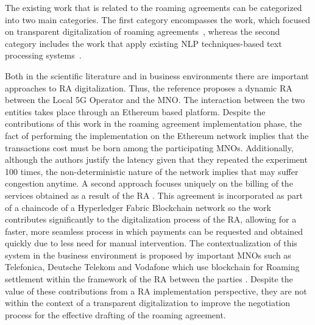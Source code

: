 \documentclass[conference]{style/IEEEtran}
\begin{document}
The existing work that is related to the roaming agreements can be categorized into two main categories. The first category encompasses the work, which focused on transparent digitalization of roaming agreements~\cite{9369516, 9024541, Huillet2020}, whereas the second category includes the work that apply existing NLP techniques-based text processing systems~\cite{8487847, 9138070, 9104105}.

Both in the scientific literature and in business environments there are important approaches to RA digitalization. Thus, the reference \cite{9369516} proposes a dynamic RA between the Local 5G Operator and the MNO. The interaction between the two entities takes place through an Ethereum based platform. Despite the contributions of this work in the roaming agreement implementation phase, the fact of performing the implementation on the Ethereum network implies that the transactions cost must be born among the participating MNOs. Additionally, although the authors justify the latency given that they repeated the experiment 100 times, the non-deterministic nature of the network implies that may suffer congestion anytime. A second approach focuses uniquely on the billing of the services obtained as a result of the RA \cite{9024541}. This agreement is incorporated as part of a chaincode of a Hyperledger Fabric Blockchain network so the work contributes significantly to the digitalization process of the RA, allowing for a faster, more seamless process in which payments can be requested and obtained quickly due to less need for manual intervention. The contextualization of this system in the business environment is proposed by important MNOs such as Telefonica, Deutsche Telekom and Vodafone which use blockchain for Roaming settlement within the framework of the RA between the parties \cite{Huillet2020}. Despite the value of these contributions from a RA implementation perspective, they are not within the context of a transparent digitalization to improve the negotiation process for the effective drafting of the roaming agreement. 
\end{document}
